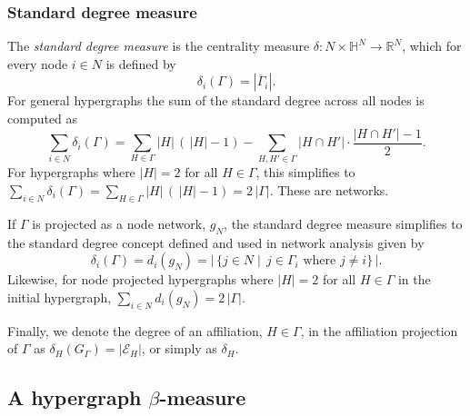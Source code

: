 \subsubsection*{Standard degree measure}

The \emph{standard degree measure} is the centrality measure $\delta \colon N \times \mathbb{H}^N \to \mathbb{R}^N$, which for every node $i \in N$ is defined by
\begin{equation}
\delta_i (\Gamma ) = \left| \overline{\Gamma}_i \right| .
\end{equation}
For general hypergraphs the sum of the standard degree across all nodes is computed as
\begin{equation}
\sum_{i \in N} \delta_i (\Gamma ) = \sum_{H \in \Gamma} | H | \, ( \, | H | - 1) - \sum_{H,H' \in \Gamma} | H \cap H' | \cdot \frac{| H \cap H' | - 1}{2} .
\end{equation}
For hypergraphs where $| H | = 2$ for all $H \in \Gamma$, this simplifies to $\sum_{i \in N} \delta_i (\Gamma ) = \sum_{H \in \Gamma} | H | \, ( \, | H | - 1) = 2 \, | \Gamma |$. These are networks.

If $\Gamma$ is projected as a node network, $g_N$, the standard degree measure simplifies to the standard degree concept defined and used in network analysis given by
\begin{equation}
\delta_i (\Gamma ) = d_i (g_N ) = | \, \{ j \in N \mid \, j  \in \Gamma_{i} \mbox{ where } j \neq i \}  \, |.
\end{equation}
Likewise, for node projected hypergraphs where $| H | = 2$ for all $H \in \Gamma$ in the initial hypergraph, $\sum_{i \in N} d_i (g_{N}) = 2 \, | \Gamma |$.

Finally, we denote the degree of an affiliation, $H \in \Gamma$, in the affiliation projection of $\Gamma$ as $\delta_{H}(G_{\Gamma}) = | \mathcal{E}_{H} |$, or simply as $\delta_{H}$.

\subsection{A hypergraph $\beta$-measure}

